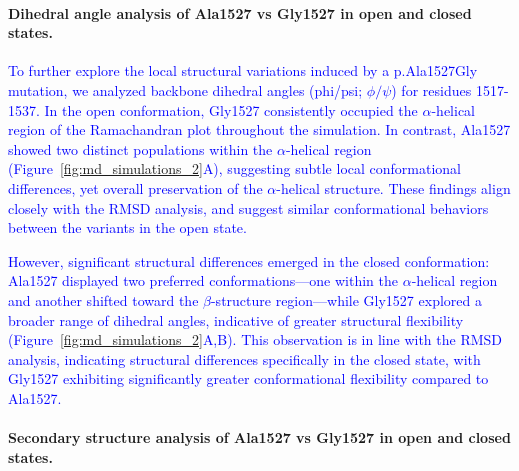 \paragraph{Dihedral angle analysis of Ala1527 vs Gly1527 in open and closed states.}
\newcommand{\quoteM}{\textcolor{blue}{To further explore the local structural variations induced by a p.Ala1527Gly mutation, we analyzed backbone dihedral angles (phi/psi; $\phi/\psi$) for residues 1517-1537. In the open conformation, Gly1527 consistently occupied the $\alpha$-helical region of the Ramachandran plot throughout the simulation. In contrast, Ala1527 showed two distinct populations within the $\alpha$-helical region (Figure~\ref{fig:md_simulations_2}A), suggesting subtle local conformational differences, yet overall preservation of the $\alpha$-helical structure. These findings align closely with the RMSD analysis, and suggest similar conformational behaviors between the variants in the open state. \label{quoteM-label}}}

\quoteM

\newcommand{\quoteN}{\textcolor{blue}{However, significant structural differences emerged in the closed conformation: Ala1527 displayed two preferred conformations—one within the $\alpha$-helical region and another shifted toward the $\beta$-structure region—while Gly1527 explored a broader range of dihedral angles, indicative of greater structural flexibility (Figure~\ref{fig:md_simulations_2}A,B). This observation is in line with the RMSD analysis, indicating structural differences specifically in the closed state, with Gly1527 exhibiting significantly greater conformational flexibility compared to Ala1527.}}

\quoteN

\paragraph{Secondary structure analysis of Ala1527 vs Gly1527 in open and closed states.}
\newcommand{\quoteO}{\textcolor{blue}{To complement backbone angle analysis, we also evaluated secondary structure stability throughout the simulation. In the open state, secondary structure content was comparable between variants, maintaining similar $\alpha$-helical character (Figure~\ref{fig:md_simulations_2}C). Upon transitioning to the closed state, both variants experienced a substantial loss of $\alpha$-helical content across residues 1517-1537. This loss, however, was more pronounced in the Gly1527 variant compared to the Ala1527 variant, as residues 1520-1525 retained partial $\alpha$-helical structure more robustly in the Ala1527 variant compared to Gly1527 (Figure~\ref{fig:md_simulations_2}C).}}

